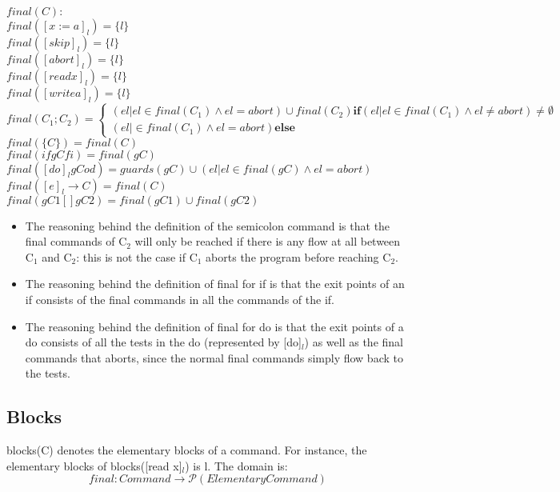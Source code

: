 $final(C):$\\
$final([x := a]_l)     = \{l\}$\\
$final([skip]_l)       = \{l\}$\\
$final([abort]_l)      = \{l\}$\\
$final([read x]_l)     = \{l\}$\\
$final([write a]_l)    = \{l\}$\\
$final(C_1; C_2)		  =
\begin{cases}
(el \vert el \in final(C_1) \wedge el = abort) \cup final(C_2) \textbf{if} (el \vert el \in final(C_1) \wedge el \neq abort) \neq \emptyset \\
(el \vert \in final(C_1) \wedge el = abort) \textbf{else}
\end{cases}$\\
$final(\{C\})          = final(C)$\\
$final(if gC fi)       = final(gC)$\\
$final([do]_l gC od)  = 
guards(gC) \cup (el \vert el \in final(gC) \wedge el = abort)$\\
$final([e]_l \to C)    = final(C)$\\
$final(gC1 [] gC2)      = final(gC1) \cup final(gC2)$\\

\begin{itemize}
\item The reasoning behind the definition of the semicolon command is that the
final commands of C$_2$ will only be reached if there is any flow at all
between C$_1$ and C$_2$: this is not the case if C$_1$ aborts the program
before reaching C$_2$.
\item The reasoning behind the definition of final for if is that the exit points
of an if consists of the final commands in all the commands of the if.
\item The reasoning behind the definition of final for do is that the exit points
of a do consists of all the tests in the do (represented by [do]$_l$)
as well as the final commands that aborts, since the normal final commands
simply flow back to the tests.
\end{itemize}



\subsection{Blocks}

blocks(C) denotes the elementary blocks of a command.
For instance, the elementary blocks of blocks([read x]$_l$) is l. The domain is:
\[final \colon Command \to \mathcal{P}(Elementary Command)\]

